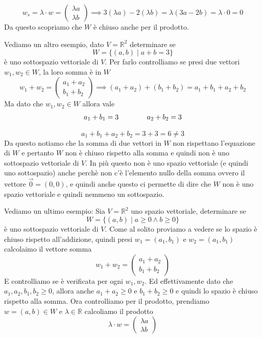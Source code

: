 \documentclass{rapport}
\begin{document}
\[
w_s=\lambda \cdot w = \begin{pmatrix}
  \lambda a \\
  \lambda b
\end{pmatrix} \implies 3(\lambda a) - 2(\lambda b) = \lambda(3a-2b) = \lambda \cdot 0 = 0
\] 
Da questo scopriamo che $W$ è chiuso anche per il prodotto. 

Vediamo un altro esempio, dato $V=\mathbb{R}^2$ determinare se 
\[
W= \{(a,b) \; |\; a+b = 3\}
\]
è uno sottospazio vettoriale di $V$. Per farlo controlliamo se presi due vettori $w_1, w_2 \in W$, la loro somma è in $W$
\[
w_1+w_2 = \begin{pmatrix}
  a_1 + a_2 \\
  b_1+b_2
\end{pmatrix} \implies (a_1+a_2) + (b_1+b_2) = a_1+b_1 + a_2+b_2
\]
Ma dato che $w_1, w_2 \in W$ allora vale 
\[
  \begin{array}{c@{\qquad}@{\qquad}c}
  a_1+b_1=3 &   a_2+b_2=3 
\end{array}
\]

\[
a_1+b_1 + a_2+b_2 = 3 +3 = 6 \ne 3
\]
Da questo notiamo che la somma di due vettori in $W$ non rispettano l'equazione di $W$ e pertanto $W$ non è chiuso rispetto alla somma e quindi non è uno sottospazio vettoriale di $V$. In più questo non è uno spazio vettoriale (e quindi uno sottospazio) anche perchè non c'è l'elemento nullo della somma ovvero il vettore $\vec{0} = (0, 0)$, e quindi anche questo ci permette di dire che $W$ non è uno spazio vettoriale e quindi nemmeno un sottospazio. 

Vediamo un ultimo esempio: Sia $V = \mathbb{R}^2$ uno spazio vettoriale, determinare se 
\[
W = \{(a,b) \;|\; a\geq 0 \land b \geq 0\}
\]
è uno sottospazio vettoriale di $V$. Come al solito proviamo a vedere se lo spazio è chiuso rispetto all'addizione, quindi presi $w_1 = (a_1, b_1)$ e $w_2=(a_1,b_1)$ calcolaimo il vettore somma
\[
w_1 +w_2 = \begin{pmatrix}
  a_1 + a_2 \\
  b_1+b_2  
\end{pmatrix}
\]
E controlliamo se è verificata per ogni $w_1,w_2$. Ed effettivamente dato che $a_1, a_2,b_1,b_2 \geq 0$, allora anche $a_1+a_2 \geq 0$ e $b_1+b_2 \geq 0$ e quindi lo spazio è chiuso rispetto alla somma. Ora controlliamo per il prodotto, prendiamo $w = (a,b)\in W$ e $\lambda \in \mathbb{R}$ calcoliamo il prodotto 
\[
\lambda \cdot w = \begin{pmatrix}
  \lambda a \\
  \lambda b
\end{pmatrix}
\]
\end{document}
